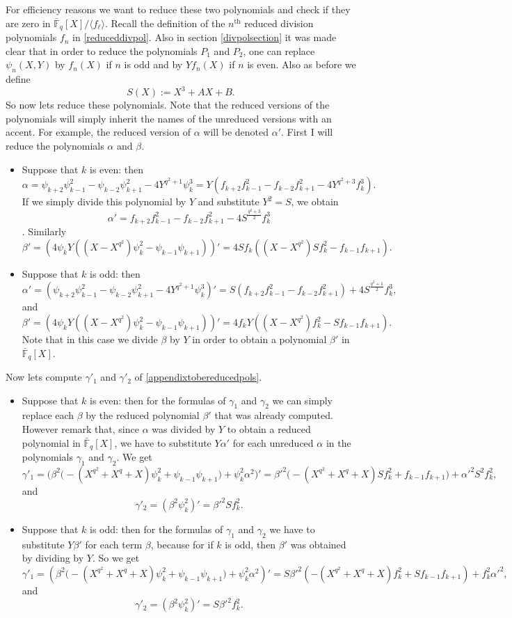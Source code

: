 \documentclass{article}
\numberwithin{equation}{section}
\theoremstyle{definition}
\newcommand{\FFCL}[1]{{\bar {\mathbb F}}_{#1}} %
\newcommand{\grgen}[1]{\langle #1 \rangle} %
\begin{document}
For efficiency reasons we want to reduce these two polynomials and check if they are zero in $\FFCL{q}[X]/\grgen{f_\ell}$. Recall the definition of the $n^\text{th}$ reduced division polynomials $f_n$ in \ref{reduceddivpol}. Also in section \ref{divpolsection} it was made clear that in order to reduce the polynomials $P_1$ and $P_2$, one can replace $\psi_n(X,Y)$ by $f_n(X)$ if $n$ is odd and by $Yf_n(X)$ if $n$ is even. Also as before we define $$ S(X):=X^3+AX+B.$$ So now lets reduce these polynomials. Note that the reduced versions of the polynomials will simply inherit the names of the unreduced versions with an accent. For example, the reduced version of $\alpha$ will be denoted $\alpha'$.  First I will reduce the polynomials $\alpha$ and $\beta$.

\begin{itemize}
\item Suppose that $k$ is even: then $$\alpha=\psi_{k+2}\psi_{k-1}^2-\psi_{k-2}\psi_{k+1}^2-4Y^{q^2+1}\psi_k^3=Y(f_{k+2}f_{k-1}^2-f_{k-2}f_{k+1}^2-4Y^{q^2+3}f_k^3).$$ If we simply divide this polynomial by $Y$ and substitute $Y^2=S$, we obtain $$\alpha'=f_{k+2}f_{k-1}^2-f_{k-2}f_{k+1}^2-4S^{\frac{q^2+3}{2}}f_k^3$$. Similarly $$\beta'=(4\psi_kY((X-X^{q^2})\psi_k^2-\psi_{k-1}\psi_{k+1}))'= 4Sf_k((X-X^{q^2})Sf_k^2-f_{k-1}f_{k+1}).$$
\item Suppose that $k$ is odd: then $$\alpha'=(\psi_{k+2}\psi_{k-1}^2-\psi_{k-2}\psi_{k+1}^2-4Y^{q^2+1}\psi_k^3)'=S(f_{k+2}f_{k-1}^2-f_{k-2}f_{k+1}^2)+4S^{\frac{q^2+1}{2}}f_k^3,$$ and 
$$\beta'=(4\psi_kY((X-X^{q^2})\psi_k^2-\psi_{k-1}\psi_{k+1}))'=4f_kY((X-X^{q^2})f_k^2-Sf_{k-1}f_{k+1}).$$ Note that in this case we divide $\beta$ by $Y$ in order to obtain a polynomial $\beta'$ in $\FFCL{q}[X]$. 
\end{itemize}

Now lets compute $\gamma'_1$ and $\gamma'_2$ of \ref{appendixtobereducedpols}.

\begin{itemize}
\item Suppose that $k$ is even: then for the formulas of $\gamma_1$ and $\gamma_2$ we can simply replace each $\beta$ by the reduced polynomial $\beta'$ that was already computed. However remark that, since $\alpha$ was divided by $Y$ to obtain a reduced polynomial in $\FFCL{q}[X]$, we have to substitute $Y\alpha'$ for each unreduced $\alpha$ in the polynomials $\gamma_1$ and $\gamma_2$. We get 
$$\gamma'_1=\big(\beta^2\big(-(X^{q^2}+X^q+X)\psi_k^2+\psi_{k-1}\psi_{k+1}\big)+\psi_k^2\alpha^2\big)'=\beta'^2\big(-(X^{q^2}+X^q+X)Sf_k^2+f_{k-1}f_{k+1}\big)+\alpha'^2S^2f_k^2,$$ and
$$\gamma'_2=(\beta^2\psi_k^2)'=\beta'^2Sf_k^2.$$
\item Suppose that $k$ is odd: then for the formulas of $\gamma_1$ and $\gamma_2$ we have to substitute $Y\beta'$ for each term $\beta$, because for if $k$ is odd, then $\beta'$ was obtained by dividing by $Y$. So we get 
$$\gamma'_1=(\beta^2\big(-(X^{q^2}+X^q+X)\psi_k^2+\psi_{k-1}\psi_{k+1}\big)+\psi_k^2\alpha^2)'=S\beta'^2(-(X^{q^2}+X^q+X)f_k^2 +Sf_{k-1}f_{k+1}) + f_k^2\alpha'^2,$$ and
$$\gamma'_2=(\beta^2\psi_k^2)'=S\beta'^2f_k^2.$$
\end{itemize}
\end{document}
